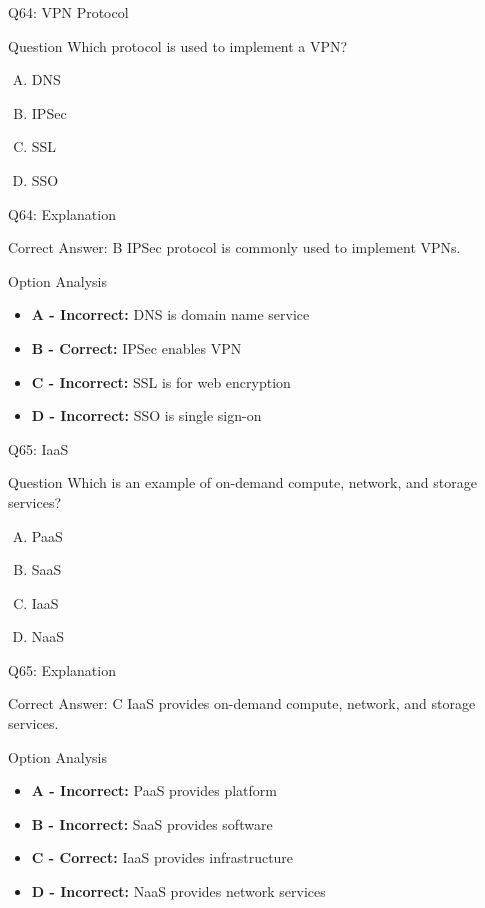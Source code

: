 \documentclass{beamer}
\begin{document}
	\begin{frame}{Q64: VPN Protocol}
		\begin{block}{Question}
			Which protocol is used to implement a VPN?
		\end{block}
		\begin{enumerate}[(A)]
			\item DNS
			\item IPSec
			\item SSL
			\item SSO
		\end{enumerate}
	\end{frame}
	
	\begin{frame}{Q64: Explanation}
		\begin{block}{Correct Answer: B}
			IPSec protocol is commonly used to implement VPNs.
		\end{block}
		\begin{block}{Option Analysis}
			\begin{itemize}
				\item \textbf{A - Incorrect:} DNS is domain name service
				\item \textbf{B - Correct:} IPSec enables VPN
				\item \textbf{C - Incorrect:} SSL is for web encryption
				\item \textbf{D - Incorrect:} SSO is single sign-on
			\end{itemize}
		\end{block}
	\end{frame}
	
	\begin{frame}{Q65: IaaS}
		\begin{block}{Question}
			Which is an example of on-demand compute, network, and storage services?
		\end{block}
		\begin{enumerate}[(A)]
			\item PaaS
			\item SaaS
			\item IaaS
			\item NaaS
		\end{enumerate}
	\end{frame}
	
	\begin{frame}{Q65: Explanation}
		\begin{block}{Correct Answer: C}
			IaaS provides on-demand compute, network, and storage services.
		\end{block}
		\begin{block}{Option Analysis}
			\begin{itemize}
				\item \textbf{A - Incorrect:} PaaS provides platform
				\item \textbf{B - Incorrect:} SaaS provides software
				\item \textbf{C - Correct:} IaaS provides infrastructure
				\item \textbf{D - Incorrect:} NaaS provides network services
			\end{itemize}
		\end{block}
	\end{frame}
	
\end{document}
